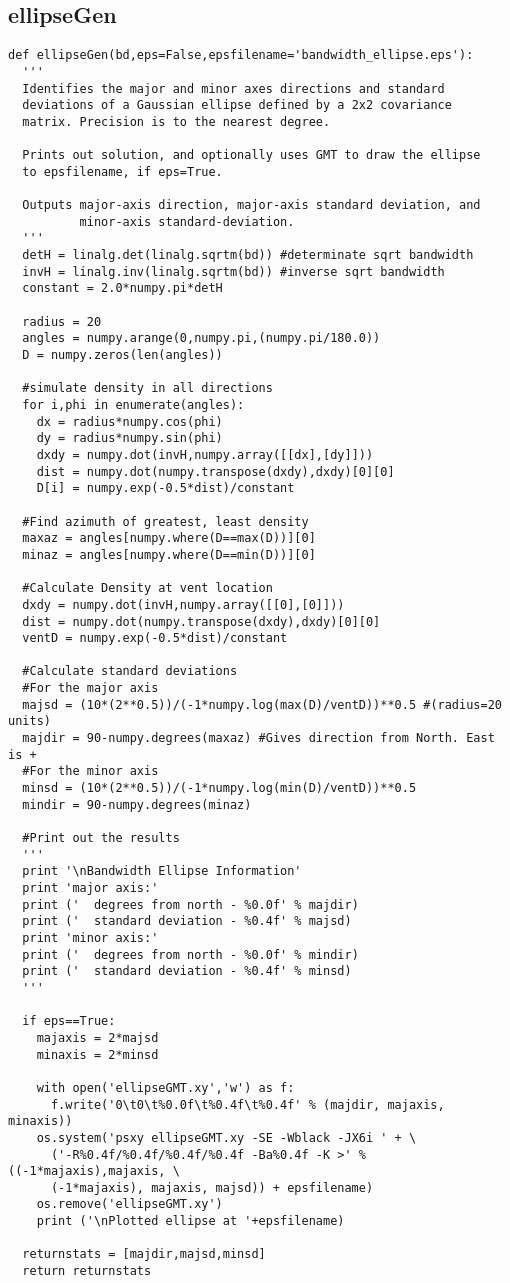 \subsection{ellipseGen}
\begin{verbatim}
def ellipseGen(bd,eps=False,epsfilename='bandwidth_ellipse.eps'):
  '''
  Identifies the major and minor axes directions and standard
  deviations of a Gaussian ellipse defined by a 2x2 covariance
  matrix. Precision is to the nearest degree.
  
  Prints out solution, and optionally uses GMT to draw the ellipse
  to epsfilename, if eps=True.
  
  Outputs major-axis direction, major-axis standard deviation, and
          minor-axis standard-deviation.
  '''
  detH = linalg.det(linalg.sqrtm(bd)) #determinate sqrt bandwidth
  invH = linalg.inv(linalg.sqrtm(bd)) #inverse sqrt bandwidth
  constant = 2.0*numpy.pi*detH
  
  radius = 20
  angles = numpy.arange(0,numpy.pi,(numpy.pi/180.0))
  D = numpy.zeros(len(angles))
  
  #simulate density in all directions
  for i,phi in enumerate(angles):
    dx = radius*numpy.cos(phi)
    dy = radius*numpy.sin(phi)
    dxdy = numpy.dot(invH,numpy.array([[dx],[dy]]))
    dist = numpy.dot(numpy.transpose(dxdy),dxdy)[0][0]
    D[i] = numpy.exp(-0.5*dist)/constant
  
  #Find azimuth of greatest, least density
  maxaz = angles[numpy.where(D==max(D))][0]
  minaz = angles[numpy.where(D==min(D))][0]
  
  #Calculate Density at vent location
  dxdy = numpy.dot(invH,numpy.array([[0],[0]]))
  dist = numpy.dot(numpy.transpose(dxdy),dxdy)[0][0]
  ventD = numpy.exp(-0.5*dist)/constant
  
  #Calculate standard deviations
  #For the major axis
  majsd = (10*(2**0.5))/(-1*numpy.log(max(D)/ventD))**0.5 #(radius=20 units)
  majdir = 90-numpy.degrees(maxaz) #Gives direction from North. East is +
  #For the minor axis
  minsd = (10*(2**0.5))/(-1*numpy.log(min(D)/ventD))**0.5
  mindir = 90-numpy.degrees(minaz)

  #Print out the results
  '''
  print '\nBandwidth Ellipse Information'
  print 'major axis:'
  print ('  degrees from north - %0.0f' % majdir)
  print ('  standard deviation - %0.4f' % majsd)
  print 'minor axis:'
  print ('  degrees from north - %0.0f' % mindir)
  print ('  standard deviation - %0.4f' % minsd)
  '''
  
  if eps==True:
    majaxis = 2*majsd
    minaxis = 2*minsd
    
    with open('ellipseGMT.xy','w') as f:
      f.write('0\t0\t%0.0f\t%0.4f\t%0.4f' % (majdir, majaxis, minaxis))
    os.system('psxy ellipseGMT.xy -SE -Wblack -JX6i ' + \ 
      ('-R%0.4f/%0.4f/%0.4f/%0.4f -Ba%0.4f -K >' % ((-1*majaxis),majaxis, \
      (-1*majaxis), majaxis, majsd)) + epsfilename)
    os.remove('ellipseGMT.xy')      
    print ('\nPlotted ellipse at '+epsfilename)
    
  returnstats = [majdir,majsd,minsd]
  return returnstats
\end{verbatim}

